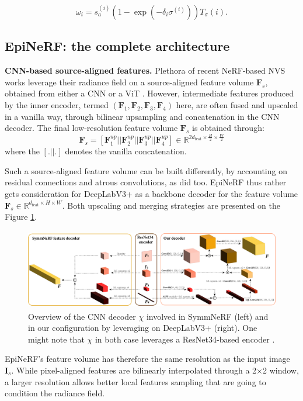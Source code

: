 \begin{equation}
    \omega_{i} = s_{a}^{(i)} \left(1 - \exp(-\delta_{i}\sigma^{(i)})\right)T_{\sigma}(i).
\end{equation}


\subsection{EpiNeRF: the complete architecture}
\label{subsec:epinerf}
\noindent\textbf{CNN-based source-aligned features.} Plethora of recent NeRF-based NVS works leverage their radiance field on a source-aligned feature volume $\mathbf{F}_{s}$, obtained from either a CNN \citep{jang2021codenerf,yu2021pixelnerf,li2022symmnerf} or a ViT \citep{lin2023vision}. However, intermediate features produced by the inner encoder, termed $(\mathbf{F}_{1},\mathbf{F}_{2},\mathbf{F}_{3},\mathbf{F}_{4})$ here,  are often fused and upscaled in a vanilla way, through bilinear upsampling and concatenation in the CNN decoder. The final low-resolution feature volume $\mathbf{F}_{s}$ is obtained through: 
\begin{equation}
    \mathbf{F}_{s} = \left[\mathbf{F}_{1}^{up} || \mathbf{F}_{2}^{up} || \mathbf{F}_{3}^{up} || \mathbf{F}_{4}^{up}\right] \in \mathbb{R}^{2d_{\text{feat}} \times \frac{H}{2} \times \frac{W}{2}}
\end{equation}
where the $[.||.]$ denotes the vanilla concatenation. 

Such a source-aligned feature volume can be built differently, by accounting on residual connections and atrous convolutions, as \citep{chan2023genvs} did too. 
EpiNeRF thus rather gets consideration for DeepLabV3+ \citep{chen2018encoder} as a backbone decoder for the feature volume $\textbf{F}_{s}\in \mathbb{R}^{d_{\text{feat}} \times H \times W}$.  Both upscaling and merging strategies are presented on the Figure \ref{fig:feature_encoder}. 

\begin{figure}[htb!]
    \center
  \includegraphics[height=3.5cm]{images/epinerf/feature_fusion_encoder.png}
  \caption{Overview of the CNN decoder $\chi$ involved in SymmNeRF (left) and in our configuration by leveraging on DeepLabV3+ (right). One might note that $\chi$ in both case leverages a ResNet34-based encoder \citep{he2016deep}. }
  \label{fig:feature_encoder}
\end{figure}
EpiNeRF's feature volume has therefore the same resolution as the input image $\mathbf{I}_s$. While pixel-aligned features are bilinearly interpolated through a 2$\times$2 window, a larger resolution allows better local features sampling that are going to condition the radiance field. \newline

